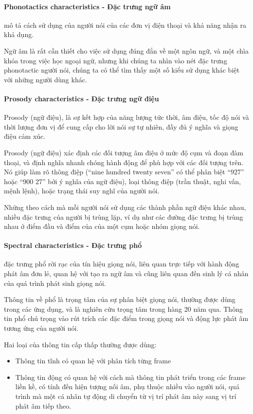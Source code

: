 \documentclass{article}
\begin{document}
	\paragraph{Phonotactics characteristics - Đặc trưng ngữ âm} mô tả cách sử dụng của người nói của các đơn vị điện thoại và khả năng nhận ra khả dụng. 
	
	Ngữ âm là rất cần thiết cho việc sử dụng đúng đắn về một ngôn ngữ, và một chìa khóa trong việc học ngoại ngữ, nhưng khi chúng ta nhìn vào nét đặc trưng phonotactic người nói, chúng ta có thể tìm thấy một số kiểu sử dụng khác biệt với những người dùng khác.
	
	\paragraph{Prosody characteristics - Đặc trưng ngữ điệu}
	Prosody (ngữ điệu), là sự kết hợp của năng lượng tức thời, âm điệu, tốc độ nói và thời lượng đơn vị để cung cấp cho lời nói sự tự nhiên, đầy đủ ý nghĩa và giọng điệu cảm xúc. 
	
	Prosody (ngữ điệu) xác định các đối tượng âm điệu ở mức độ cụm và đoạn đàm thoại, và định nghĩa nhanh chóng hành động để phù hợp với các đối tượng trên. Nó giúp làm rõ thông điệp (“nine hundred twenty seven”  có thể phân biệt “927” hoặc “900 27” bởi ý nghĩa của ngữ điệu), loại thông điệp (trần thuật, nghi vấn, mệnh lệnh), hoặc trạng thái suy nghĩ của người nói. 
	
	Những theo cách mà mỗi người nói sử dụng các thành phần ngữ điệu khác nhau, nhiều đặc trưng của người bị trùng lặp, ví dụ như các đường đặc trưng bị trùng nhau ở điểm đầu và điểm của của một cụm hoặc nhóm giọng nói.
	
	\paragraph{Spectral characteristics - Đặc trưng phổ}
	 đặc trưng phổ rời rạc của tín hiệu giọng nói, liên quan trực tiếp với hành động phát âm đơn lẻ, quan hệ với tạo ra ngữ âm và cũng liên quan đến sinh lý cá nhân của quá trình phát sinh giọng nói. 
	 
	 Thông tin về phổ là trọng tâm của sự phân biệt giọng nói, thường được dùng trong các ứng dụng, và là nghiên cứu trọng tâm trong hàng 20 năm qua. Thông tin phổ chú trọng vào rút trích các đặc điểm trong giọng nói và động lực phát âm tương ứng của người nói. 
	 
	 Hai loại của thông tin cấp thấp thường được dùng:
	 \begin{itemize}
	 	\item Thông tin tĩnh có quan hệ với phân tích từng frame
	 	\item Thông tin động có quan hệ với cách mà thông tin phát triển trong các frame liền kề, có tính đến hiện tượng nối âm, phụ thuộc nhiều vào người nói, quá trình mà một cá nhân tự động di chuyển từ vị trí phát âm này sang vị trí phát âm tiếp theo.
	 \end{itemize}
	
\end{document}
